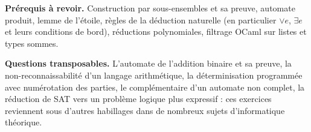 \documentclass[11pt,a4paper]{article}
\begin{document}
\textbf{Prérequis à revoir.} Construction par sous-ensembles et sa preuve, automate produit, lemme de l'étoile, règles de la déduction naturelle (en particulier \(\vee e\), \(\exists e\) et leurs conditions de bord), réductions polynomiales, filtrage OCaml sur listes et types sommes.

\textbf{Questions transposables.} L'automate de l'addition binaire et sa preuve, la non-reconnaissabilité d'un langage arithmétique, la déterminisation programmée avec numérotation des parties, le complémentaire d'un automate non complet, la réduction de SAT vers un problème logique plus expressif : ces exercices reviennent sous d'autres habillages dans de nombreux sujets d'informatique théorique.
\end{document}
